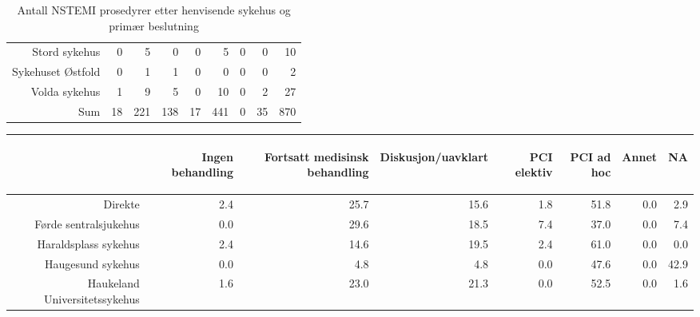 \documentclass[presentation,xcolor=pdftex,dvipsnames,table]{beamer}
\begin{document}
\begin{frame}
\begin{tiny}
\begin{table}[ht]
\begin{tabular}{rrrrrrrrr}
  Stord sykehus & 0 & 5 & 0 & 0 & 5 & 0 & 0 & 10 \\ 
  Sykehuset Østfold & 0 & 1 & 1 & 0 & 0 & 0 & 0 & 2 \\ 
  Volda sykehus & 1 & 9 & 5 & 0 & 10 & 0 & 2 & 27 \\ 
  Sum & 18 & 221 & 138 & 17 & 441 & 0 & 35 & 870 \\ 
   \bottomrule
\end{tabular}
\caption{Antall NSTEMI prosedyrer etter henvisende sykehus og primær beslutning} 
\end{table}\end{tiny}
\end{frame}



\begin{frame}
\begin{tiny}
\begin{table}[ht]
\centering
\begin{tabular}{rrrrrrrr}
  \toprule
 & \begin{sideways} Ingen behandling \end{sideways} & \begin{sideways} Fortsatt medisinsk behandling \end{sideways} & \begin{sideways} Diskusjon/uavklart \end{sideways} & \begin{sideways} PCI elektiv \end{sideways} & \begin{sideways} PCI ad hoc \end{sideways} & \begin{sideways} Annet \end{sideways} & \begin{sideways} NA \end{sideways} \\ 
  \midrule
Direkte & 2.4 & 25.7 & 15.6 & 1.8 & 51.8 & 0.0 & 2.9 \\ 
  Førde sentralsjukehus & 0.0 & 29.6 & 18.5 & 7.4 & 37.0 & 0.0 & 7.4 \\ 
  Haraldsplass sykehus & 2.4 & 14.6 & 19.5 & 2.4 & 61.0 & 0.0 & 0.0 \\ 
  Haugesund sykehus & 0.0 & 4.8 & 4.8 & 0.0 & 47.6 & 0.0 & 42.9 \\ 
  Haukeland Universitetssykehus & 1.6 & 23.0 & 21.3 & 0.0 & 52.5 & 0.0 & 1.6 \\ 

\end{tabular}
\end{table}
\end{tiny}
\end{frame}
\end{document}
